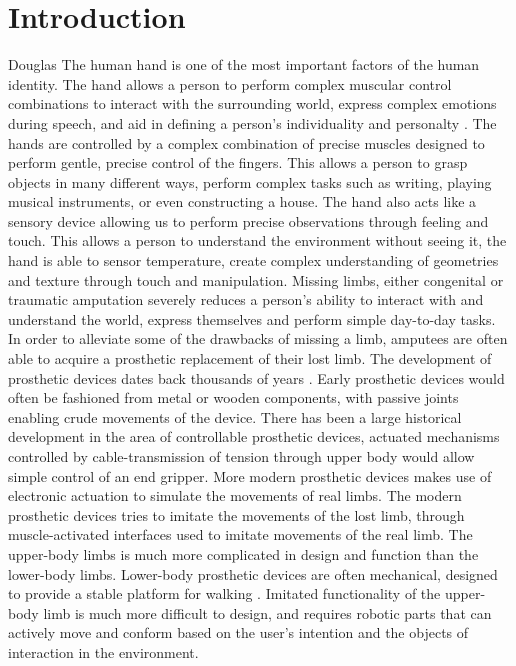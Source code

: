 \documentclass[../main.tex]{subfiles}
\begin{document}
\section{Introduction}

Douglas 
The human hand is one of the most important factors of the human identity.
The hand allows a person to perform complex muscular control combinations to interact with the surrounding world, express complex emotions during speech, and aid in defining a person's individuality and personalty \cite{Douglashands}.
The hands are controlled by a complex combination of precise muscles designed to perform gentle, precise control of the fingers.
This allows a person to grasp objects in many different ways, perform complex tasks such as writing, playing musical instruments, or even constructing a house.
The hand also acts like a sensory device allowing us to perform precise observations through feeling and touch.
This allows a person to understand the environment without seeing it, the hand is able to sensor temperature, create complex understanding of geometries and texture through touch and manipulation.
Missing limbs, either \gls{congenital} or \gls{traumatic} amputation severely reduces a person's ability to interact with and understand the world, express themselves and perform simple day-to-day tasks.
In order to alleviate some of the drawbacks of missing a limb, amputees are often able to acquire a prosthetic replacement of their lost limb.
The development of prosthetic devices dates back thousands of years \cite{Kevin2014}.
Early prosthetic devices would often be fashioned from metal or wooden components, with passive joints enabling crude movements of the device. 
There has been a large historical development in the area of controllable prosthetic devices, actuated mechanisms controlled by cable-transmission of tension through upper body would allow simple control of an end gripper.
More modern prosthetic devices makes use of electronic actuation to simulate the movements of real limbs.
The modern prosthetic devices tries to imitate the movements of the lost limb, through muscle-activated interfaces used to imitate movements of the real limb. 
The upper-body limbs is much more complicated in design and function than the lower-body limbs.
Lower-body prosthetic devices are often mechanical, designed to provide a stable platform for walking \cite{mechanicallegs}.
Imitated functionality of the upper-body limb is much more difficult to design, and requires robotic parts that can actively move and conform based on the user's intention and the objects of interaction in the environment.  
\end{document}
